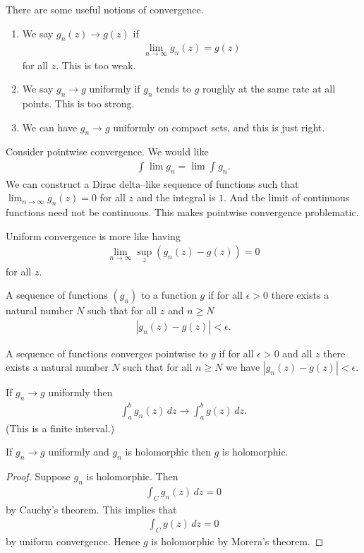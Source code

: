 \documentclass[11pt, oneside,margin=1in]{article}
\begin{document}
There are some useful notions of convergence.
\begin{enumerate}
	\item We say $g_n(z)\to g (z)$  if
		\begin{align*}
			\lim_{n\to\infty} g_n(z) = g (z)
		\end{align*}
		for all $z$. This is too weak.
	\item We say $g_n\to g$ uniformly if $g_n$ tends to $g$ roughly at the same rate at all points. This is too strong.
	\item We can have $g_n\to g$ uniformly on compact sets, and this is just right.
\end{enumerate}

Consider pointwise convergence. We would like
\begin{align*}
	\int_{}^{} \lim g_n = \lim \int_{}^{} g_n. 
\end{align*}
We can construct a Dirac delta--like sequence of functions such that $\lim_{n\to\infty}g_n(z) =0$ for all $z$ and the integral is $1$. And the limit of continuous functions need not be continuous. This makes pointwise convergence problematic.

Uniform convergence is more like having 
\begin{align*}
	\lim_{n\to\infty} \sup_z (g_n(z)-g (z)) =0
\end{align*}
for all $z$.
\begin{definition}\label{}\text{}
A sequence of functions $(g_n)$  to a function $g$ if for all $\epsilon > 0$ there exists a natural number $N$ such that for all $z$ and $n\ge N$
\begin{align*}
 \left\lvert g_n(z) - g (z) \right\rvert <\epsilon.
\end{align*}
\end{definition}

A sequence of functions converges pointwise to $g$ if for all $\epsilon >0$ and all $z$ there exists a natural number $N$ such that for all $n\ge N$ we have $\left\lvert g_n(z) -g(z)\right\rvert <\epsilon$.

\begin{remark}
	If $g_n\to g$ uniformly then 
	\begin{align*}
		\int_{a}^{b} g_n(z)  \, dz \longrightarrow \int_{a}^{b} g(z)  \, dz.  
	\end{align*}
	(This is a finite interval.)
\end{remark}
\begin{remark}
	If $g_n\to g$ uniformly and $g_n$ is holomorphic then $g$ is holomorphic.
\end{remark}
\begin{proof}
Suppose $g_n$ is holomorphic. Then 
\begin{align*}
	\int_{C}^{} g_n(z)  \, d z = 0
\end{align*}
by Cauchy's theorem. This implies that 
\begin{align*}
	\int_{C}^{} g(z)  \, dz =0
\end{align*}
by uniform convergence. Hence $g$ is holomorphic by Morera's theorem.
\end{proof}
\end{document}
